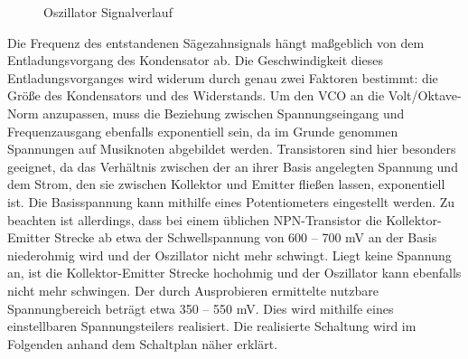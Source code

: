 \begin{figure}[h]
	\centering
	\setlength{\fboxsep}{1pt} %
	\setlength{\fboxrule}{1pt} %
	\caption{Oszillator Signalverlauf}
	\label{fig:Oszillator_Signalverlauf}
\end{figure}

\newpage

Die Frequenz des entstandenen Sägezahnsignals hängt maßgeblich von dem Entladungsvorgang des Kondensator ab.
Die Geschwindigkeit dieses Entladungsvorganges wird widerum durch genau zwei Faktoren bestimmt: die Größe des Kondensators und des Widerstands.
Um den VCO an die Volt/Oktave-Norm anzupassen, muss die Beziehung zwischen Spannungseingang und Frequenzausgang ebenfalls exponentiell sein, da im Grunde genommen Spannungen auf Musiknoten abgebildet werden. 
Transistoren sind hier besonders geeignet, da das Verhältnis zwischen der an ihrer Basis angelegten Spannung und dem Strom, den sie zwischen Kollektor und Emitter fließen lassen, exponentiell ist.
Die Basisspannung kann mithilfe eines Potentiometers eingestellt werden.
Zu beachten ist allerdings, dass bei einem üblichen NPN-Transistor die Kollektor-Emitter Strecke ab etwa der Schwellspannung von 600 -- 700 mV an der Basis niederohmig wird und der Oszillator nicht mehr schwingt. 
Liegt keine Spannung an, ist die Kollektor-Emitter Strecke hochohmig und der Oszillator kann ebenfalls nicht mehr schwingen.
Der durch Ausprobieren ermittelte nutzbare Spannungbereich beträgt etwa 350 -- 550 mV.
Dies wird mithilfe eines einstellbaren Spannungsteilers realisiert.
Die realisierte Schaltung wird im Folgenden anhand dem Schaltplan näher erklärt.


